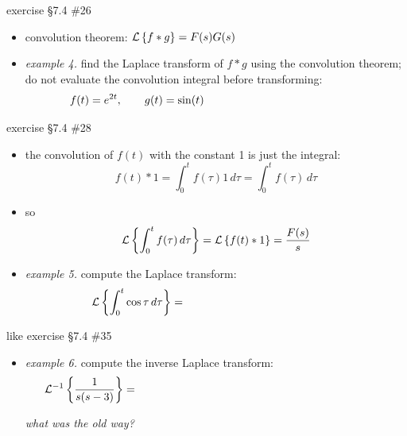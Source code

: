 \documentclass[urlcolor=blue,dvipsnames]{beamer}
\begin{document}
\begin{frame}{exercise \S7.4 \#26}

\begin{itemize}
\item convolution theorem: \quad $\mathcal{L}\left\{f \ast g\right\} = F(s) G(s)$
\item \emph{example 4.}  find the Laplace transform of $f\ast g$ using the convolution theorem; do not evaluate the convolution integral before transforming:
    $$f(t)=e^{2t}, \qquad g(t)=\sin(t) \hspace{50mm}$$
\end{itemize}

\vspace{40mm}
\end{frame}


\begin{frame}{exercise \S7.4 \#28}

\begin{itemize}
\item the convolution of $f(t)$ with the constant 1 is just the integral:
    $$f(t) \ast 1 = \int_0^t f(\tau) 1\,d\tau = \int_0^t f(\tau)\,d\tau$$
\item so
    $$\mathcal{L}\left\{\int_0^t f(\tau)\,d\tau\right\} = \mathcal{L}\left\{f(t)\ast 1\right\} = \frac{F(s)}{s}$$
\item \emph{example 5.}  compute the Laplace transform:
    $$\LL{\int_0^t \cos \tau\,d\tau} = \hspace{50mm}$$
\end{itemize}

\vspace{25mm}
\end{frame}


\begin{frame}{like exercise \S7.4 \#35}

\begin{itemize}
\item \emph{example 6.}  compute the inverse Laplace transform:
    $$\LLi{\frac{1}{s(s-3)}} = \hspace{80mm}$$

\vspace{40mm}
\hfill \scriptsize \emph{what was the old way?}
\end{itemize}
\end{frame}
\end{document}
